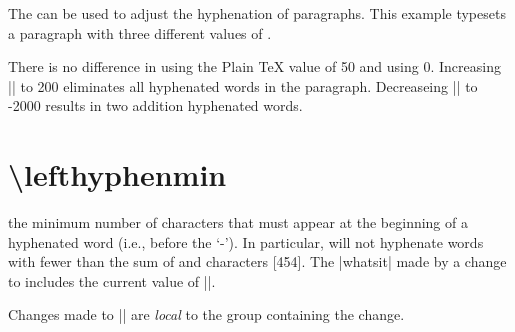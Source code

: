 \begin{texexample}{}{}
\end{texexample}

The  can be used to adjust the hyphenation of paragraphs. 
This example typesets a paragraph with three different values of . 

There is no difference in using the Plain TeX value of 50 and using 0. 
Increasing |\hyphenpenalty| to 200 eliminates all hyphenated words in the paragraph. 
Decreaseing |\hyphenpenalty|  to -2000 results in two addition hyphenated words.






\section*{\textbackslash lefthyphenmin}
 the minimum number of characters that must appear at the beginning of a hyphenated word (i.e., before the `-'). In particular, \tex will not hyphenate words with fewer than the sum of  and  characters [454]. The |whatsit|  made by a change to  includes the current value of |\lefthyphenmin|.

Changes made to |\lefthyphenmin| are \textit{local} to the group containing the change.


